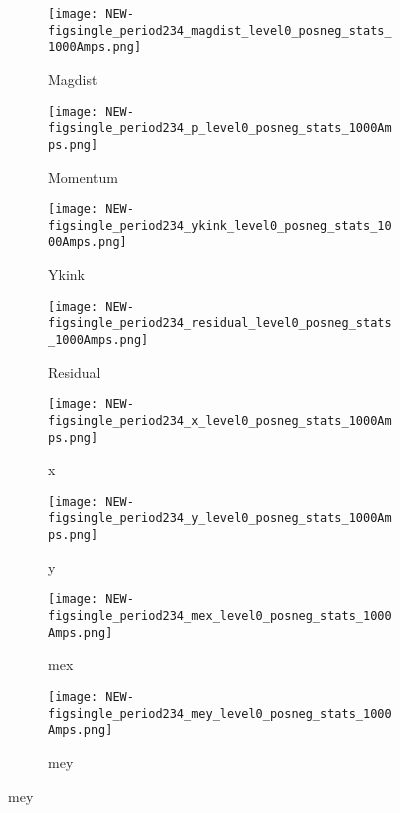  
         \begin{figure}[h]	   
            \centering
   
            \begin{subfigure}[b]{0.24\textwidth}
            \centering
           \texttt{[image: NEW-figsingle\_period234\_magdist\_level0\_posneg\_stats\_1000Amps.png]}
            \caption{Magdist}
            \label{fig_magdist1}
           
            \end{subfigure}
            \hfill             
             \begin{subfigure}[b]{0.24\textwidth}
            \centering
	 \texttt{[image: NEW-figsingle\_period234\_p\_level0\_posneg\_stats\_1000Amps.png]}
            \caption{Momentum}
            \label{fig_p1}
            \end{subfigure}
             \hfill   
             \begin{subfigure}[b]{0.24\textwidth}
            \centering
            \texttt{[image: NEW-figsingle\_period234\_ykink\_level0\_posneg\_stats\_1000Amps.png]}
            \caption{Ykink}
            \label{fig_ykink1}
            \end{subfigure}
             \hfill   
             \begin{subfigure}[b]{0.24\textwidth}
            \centering
            \texttt{[image: NEW-figsingle\_period234\_residual\_level0\_posneg\_stats\_1000Amps.png]}
            \caption{Residual}
            \label{fig_residual1}
            \end{subfigure}
            
            \begin{subfigure}[b]{0.24\textwidth}
            \centering
            \texttt{[image: NEW-figsingle\_period234\_x\_level0\_posneg\_stats\_1000Amps.png]}
            \caption{x}
            \label{fig_x1}
            \end{subfigure}
            \hfill             
             \begin{subfigure}[b]{0.24\textwidth}
            \centering
            \texttt{[image: NEW-figsingle\_period234\_y\_level0\_posneg\_stats\_1000Amps.png]}
            \caption{y}
            \label{fig_y1}
            \end{subfigure}
             \hfill   
             \begin{subfigure}[b]{0.24\textwidth}
            \centering
            \texttt{[image: NEW-figsingle\_period234\_mex\_level0\_posneg\_stats\_1000Amps.png]}
            \caption{mex}
            \label{fig_mex1}
            \end{subfigure}
             \hfill   
             \begin{subfigure}[b]{0.24\textwidth}
            \centering
            \texttt{[image: NEW-figsingle\_period234\_mey\_level0\_posneg\_stats\_1000Amps.png]}
            \caption{mey}
            \label{fig_mey1}
            \end{subfigure}
            

\end{figure}
